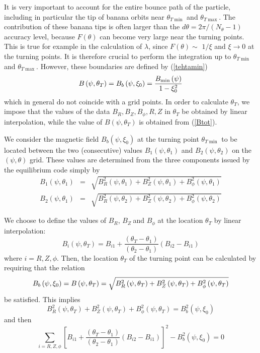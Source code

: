 \documentclass{article}
\begin{document}
It is very important to account for the entire bounce path of the particle,
including in particular the tip of banana orbits near $\theta _{T\min }$ and 
$\theta _{T\max }$. The contribution of these banana tips is often larger
than the $d\theta =2\pi /(N_{\theta }-1)$ accuracy level, because $F\left(
\theta \right) $ can become very large near the turning points. This is true
for example in the calculation of $\lambda $, since $F\left( \theta \right)
\sim $ $1/\xi $ and $\xi \rightarrow 0$ at the turning points. It is
therefore crucial to perform the integration up to $\theta _{T\min }$ and $%
\theta _{T\max }$. However, these boundaries are defined by (\ref{tehtamin}) 
\begin{equation}
B\left( \psi ,\theta _{T}\right) =B_{b}\left( \psi ,\xi _{0}\right) =\frac{%
B_{\min }\left( \psi \right) }{1-\xi _{0}^{2}}
\end{equation}
which in general do not coincide with a grid points. In order to calculate $%
\theta _{T}$, we impose that the values of the data $B_{R},B_{Z},B_{\phi
},R,Z$ in $\theta _{T}$ be obtained by linear interpolation, while the value
of $B\left( \psi ,\theta _{T}\right) $ is obtained from (\ref{Btot}).

We consider the magnetic field $B_{b}\left( \psi ,\xi _{0}\right) $ at the
turning point $\theta _{T\min }$ to be located between the two (consecutive)
values $B_{1}\left( \psi ,\theta _{1}\right) $ and $B_{2}\left( \psi ,\theta
_{2}\right) $ on the $\left( \psi ,\theta \right) $ grid. These values are
determined from the three components issued by the equilibrium code simply
by 
\begin{eqnarray*}
B_{1}\left( \psi ,\theta _{1}\right) &=&\sqrt{B_{R}^{2}\left( \psi ,\theta
_{1}\right) +B_{Z}^{2}\left( \psi ,\theta _{1}\right) +B_{\phi }^{2}\left(
\psi ,\theta _{1}\right) } \\
B_{2}\left( \psi ,\theta _{1}\right) &=&\sqrt{B_{R}^{2}\left( \psi ,\theta
_{2}\right) +B_{Z}^{2}\left( \psi ,\theta _{2}\right) +B_{\phi }^{2}\left(
\psi ,\theta _{2}\right) }
\end{eqnarray*}

We choose to define the values of $B_{R}$, $B_{Z}\ $and $B_{\phi }$ at the
location $\theta _{T}$ by linear interpolation: 
\[
B_{i}\left( \psi ,\theta _{T}\right) =B_{i1}+\frac{\left( \theta _{T}-\theta
_{1}\right) }{\left( \theta _{2}-\theta _{1}\right) }\left(
B_{i2}-B_{i1}\right) 
\]
where $i=R,Z,\phi $. Then, the location $\theta _{T}$ of the turning point
can be calculated by requiring that the relation 
\[
B_{b}\left( \psi ,\xi _{0}\right) =B\left( \psi ,\theta _{T}\right) =\sqrt{%
B_{R}^{2}\left( \psi ,\theta _{T}\right) +B_{Z}^{2}\left( \psi ,\theta
_{T}\right) +B_{\phi }^{2}\left( \psi ,\theta _{T}\right) } 
\]
be satisfied. This implies 
\[
B_{R}^{2}\left( \psi ,\theta _{T}\right) +B_{Z}^{2}\left( \psi ,\theta
_{T}\right) +B_{\phi }^{2}\left( \psi ,\theta _{T}\right) =B_{b}^{2}\left(
\psi ,\xi _{0}\right) 
\]
and then 
\[
\sum_{i=R,Z,\phi }\left[ B_{i1}+\frac{\left( \theta _{T}-\theta _{1}\right) 
}{\left( \theta _{2}-\theta _{1}\right) }\left( B_{i2}-B_{i1}\right) \right]
^{2}-B_{b}^{2}\left( \psi ,\xi _{0}\right) =0 
\]
\end{document}
